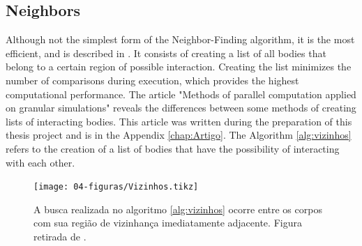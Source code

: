 \subsection{Neighbors}

    Although not the simplest form of the Neighbor-Finding algorithm, it is the most efficient, and is described in \cite{Dissertacao}. It consists of creating a list of all bodies that belong to a certain region of possible interaction. Creating the list minimizes the number of comparisons during execution, which provides the highest computational performance. The article "Methods of parallel computation applied on granular simulations" \cite{Methods_of_Parallel_Computation_Applied_on_Granular_Simulations} reveals the differences between some methods of creating lists of interacting bodies. This article was written during the preparation of this thesis project and is in the Appendix \ref{chap:Artigo}. The Algorithm \ref{alg:vizinhos} refers to the creation of a list of bodies that have the possibility of interacting with each other.



\begin{figure}
    \centering
    \texttt{[image: 04-figuras/Vizinhos.tikz]}
    \caption[Neighbor search.]{A busca realizada no algoritmo \ref{alg:vizinhos} ocorre entre os corpos com sua região de vizinhança imediatamente adjacente. Figura retirada de \cite{Dissertacao}.}
    \label{fig:vizinhos}
\end{figure}


